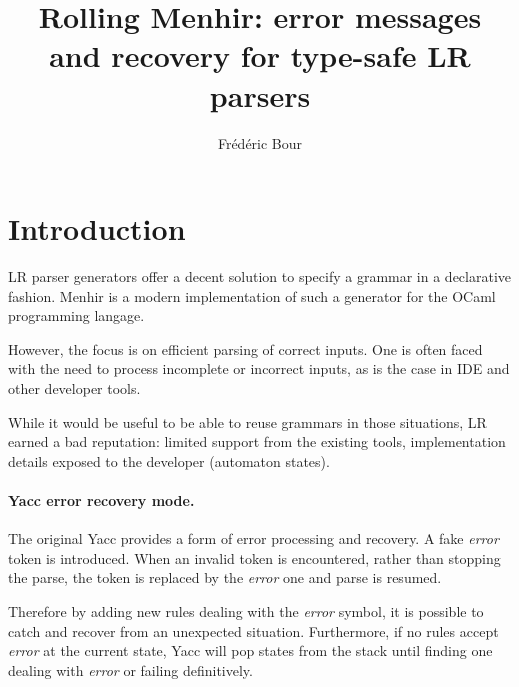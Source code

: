 \documentclass[twoside,a4paper]{article}
\title{Rolling Menhir: error messages and recovery for type-safe LR parsers}
\author{Frédéric Bour}%
\begin{document}
\setcounter{page}{1}
\maketitle

\section{Introduction}


LR parser generators offer a decent solution to specify a grammar in a
declarative fashion.  Menhir is a modern implementation of such a generator for
the OCaml programming langage.


However, the focus is on efficient parsing of correct inputs.  One is often
faced with the need to process incomplete or incorrect inputs, as is the case
in IDE and other developer tools.


While it would be useful to be able to reuse grammars in those situations, LR
earned a bad reputation: limited support from the existing tools,
implementation details exposed to the developer (automaton states).


\paragraph{Yacc error recovery mode.}
The original Yacc provides a form of error processing and recovery. A fake {\em
error} token is introduced. When an invalid token is encountered, rather than
stopping the parse, the token is replaced by the {\em error} one and parse is
resumed.

Therefore by adding new rules dealing with the {\em error} symbol, it is
possible to catch and recover from an unexpected situation.  Furthermore, if no
rules accept {\em error} at the current state, Yacc will pop states from the
stack until finding one dealing with {\em error} or failing definitively.
\end{document}
